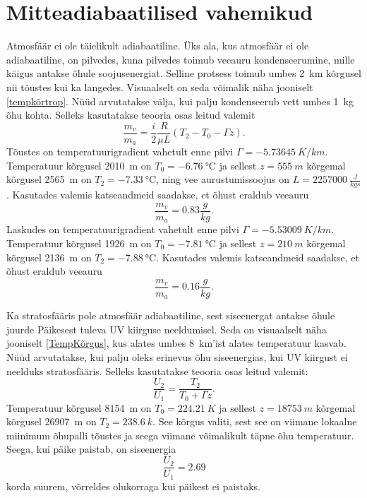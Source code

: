 \documentclass{trkut}%
\begin{document}
\section{Mitteadiabaatilised vahemikud}
Atmosfäär ei ole täielikult adiabaatiline. Üks ala, kus atmosfäär ei ole adiabaatiline, on pilvedes, kuna pilvedes toimub veeauru kondenseerumine, mille käigus antakse õhule soojusenergiat. Selline protsess toimub umbes \SI{2}{km} kõrgusel nii tõustes kui ka langedes. Visuaalselt on seda võimalik näha jooniselt \ref{tempkõrtrop}. Nüüd arvutatakse välja, kui palju kondenseerub vett umbes \SI{1}{kg} õhu kohta. Selleks kasutatakse teooria osas leitud valemit
\begin{equation}
\frac{m_v}{m_a} = \frac{i}{2}\frac{R}{\mu L}\left(T_2- T_0 - \Gamma z\right).
\end{equation}
Tõustes on temperatuurigradient vahetult enne pilvi $\Gamma = \SI{-5.73645}{K/km}$. Temperatuur kõrgusel \SI{2010}{m} on $T_0 = \SI{-6.76}{\degreeCelsius}$ ja sellest $z = \SI{555}{m}$ kõrgemal kõrgusel \SI{2565}{m} on $T_2 = \SI{-7.33}{\degreeCelsius}$, ning vee aurustumissoojus on $L = \SI{2257000}{\frac{J}{kgs}}$. Kasutades valemis katseandmeid saadakse, et õhust eraldub veeauru
\begin{equation}
\frac{m_v}{m_a} = 0.83 \frac{g}{kg}.
\end{equation}
Laskudes on temperatuurigradient vahetult enne pilvi $\Gamma = \SI{-5.53009}{K/km}$. Temperatuur kõrgusel \SI{1926}{m} on $T_0 = \SI{-7.81}{\degreeCelsius}$ ja sellest $z = \SI{210}{m}$ kõrgemal kõrgusel \SI{2136}{m} on $T_2 = \SI{-7.88}{\degreeCelsius}$. Kasutades valemis katseandmeid saadakse, et õhust eraldub veeauru
\begin{equation}
\frac{m_v}{m_a} = 0.16 \frac{g}{kg}.
\end{equation}

Ka stratosfääris pole atmosfäär adiabaatiline, sest siseenergat antakse õhule juurde Päikesest tuleva UV kiirguse neeldumisel. Seda on visuaalselt näha jooniselt \ref{TempKõrgus}, kus alates umbes \SI{8}{km}'ist alates temperatuur kasvab. Nüüd arvutatakse, kui palju oleks erinevus õhu siseenergias, kui UV kiirgust ei neelduks stratosfääris. Selleks kasutatakse teooria osas leitud valemit:
\begin{equation}
\frac{U_2}{U_1} = \frac{T_2}{T_0+\Gamma z}.
\end{equation}
Temperatuur kõrgusel \SI{8154}{m} on $T_0 = \SI{224.21}{K}$ ja sellest $z = \SI{18753}{m}$ kõrgemal kõrgusel \SI{26907}{m} on $T_2 = \SI{238.6}{k}$. See kõrgus valiti, sest see on viimane lokaalne miinimum õhupalli tõustes ja seega viimane võimalikult täpne õhu temperatuur. Seega, kui päike paistab, on siseenergia 
\begin{equation}
\frac{U_2}{U_1} = 2.69
\end{equation}
korda suurem, võrreldes olukorraga kui päikest ei paistaks.
\end{document}
